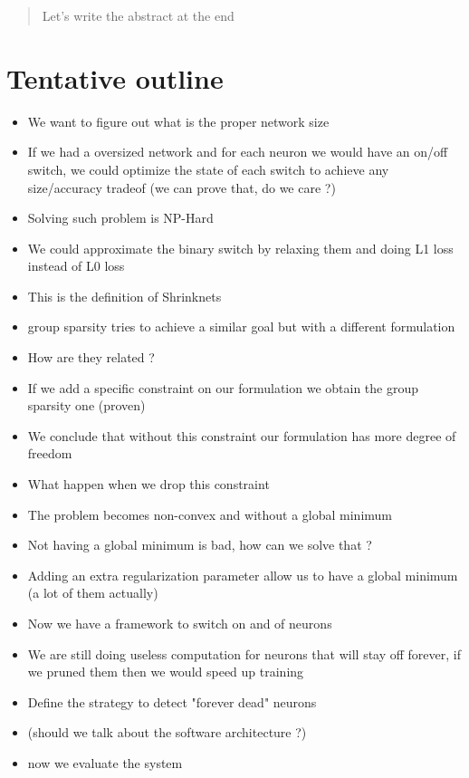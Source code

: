\documentclass{article}
\begin{document}
\begin{abstract}
  Let's write the abstract at the end
\end{abstract}

\section{Tentative outline}

\begin{itemize}
  \item We want to figure out what is the proper network size
  \item If we had a oversized network and for each neuron we would have an on/off switch, we could optimize the state of each switch to achieve any size/accuracy tradeof (we can prove that, do we care ?)
  \item Solving such problem is NP-Hard
  \item We could approximate the binary switch by relaxing them and doing L1 loss instead of L0 loss
  \item This is the definition of Shrinknets
  \item group sparsity tries to achieve a similar goal but with a different formulation
  \item How are they related ?
  \item If we add a specific constraint on our formulation we obtain the group sparsity one (proven)
  \item We conclude that without this constraint our formulation has more degree of freedom
  \item What happen when we drop this constraint
  \item The problem becomes non-convex and without a global minimum
  \item Not having a global minimum is bad, how can we solve that ?
  \item Adding an extra regularization parameter allow us to have a global minimum (a lot of them actually)
  \item Now we have a framework to switch on and of neurons
  \item We are still doing useless computation for neurons that will stay off forever, if we pruned them then we would speed up training
  \item Define the strategy to detect "forever dead" neurons
  \item (should we talk about the software architecture ?)
  \item now we evaluate the system

\end{itemize}
\end{document}
